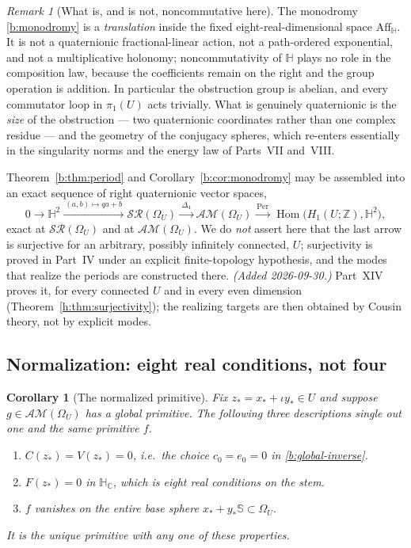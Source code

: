 \documentclass[11pt,a4paper]{article}
\numberwithin{equation}{section}
\newtheorem{corollary}[theorem]{Corollary}
\theoremstyle{definition}
\theoremstyle{remark}
\newtheorem{remark}[theorem]{Remark}
\theoremstyle{plain}
\newcommand{\HH}{\mathbb H}
\newcommand{\HC}{\mathbb H_{\mathbb C}}
\newcommand{\ZZ}{\mathbb Z}
\newcommand{\SSS}{\mathbb S}
\newcommand{\lap}{\Delta_4}
\newcommand{\SR}{\mathcal{SR}}
\newcommand{\AM}{\mathcal{AM}}
\newcommand{\Om}{\Omega}
\newcommand{\Aff}{\mathrm{Aff}_{\HH}}
\newcommand{\Per}{\mathrm{Per}}
\newcommand{\pot}{C}          %
\newcommand{\potV}{V}         %
\begin{document}
\begin{remark}[What is, and is not, noncommutative here]
\label{b:rem:abelian}
The monodromy \eqref{b:monodromy} is a \emph{translation} inside the fixed
eight-real-dimensional space $\Aff$.  It is not a quaternionic
fractional-linear action, not a path-ordered exponential, and not a
multiplicative holonomy; noncommutativity of $\HH$ plays no role in the
composition law, because the coefficients remain on the right and the group
operation is addition.  In particular the obstruction group is abelian, and
every commutator loop in $\pi_1(U)$ acts trivially.  What is genuinely
quaternionic is the \emph{size} of the obstruction --- two quaternionic
coordinates rather than one complex residue --- and the geometry of the
conjugacy spheres, which re-enters essentially in the singularity norms and
the energy law of Parts~VII and~VIII.
\end{remark}

Theorem~\ref{b:thm:period} and Corollary~\ref{b:cor:monodromy} may be
assembled into an exact sequence of right quaternionic vector spaces,
\begin{equation}
 0\longrightarrow\HH^2\xrightarrow{\ (a,b)\mapsto qa+b\ }
 \SR(\Om_U)\xrightarrow{\ \lap\ }\AM(\Om_U)
 \xrightarrow{\ \Per\ }\operatorname{Hom}\bigl(H_1(U;\ZZ),\HH^2\bigr),
 \label{b:exact-general}
\end{equation}
exact at $\SR(\Om_U)$ and at $\AM(\Om_U)$.  We do \emph{not} assert here that
the last arrow is surjective for an arbitrary, possibly infinitely connected,
$U$; surjectivity is proved in Part~IV under an explicit finite-topology
hypothesis, and the modes that realize the periods are constructed there.
\emph{(Added 2026-09-30.)} Part~XIV proves it, for every connected $U$ and in
every even dimension (Theorem~\ref{h:thm:surjectivity}); the realizing
targets are then obtained by Cousin theory, not by explicit modes.

\subsection{Normalization: eight real conditions, not four}
\label{b:sub:normalization}

\begin{corollary}[The normalized primitive]
\label{b:cor:normalization}
Fix $z_*=x_*+\iota y_*\in U$ and suppose $g\in\AM(\Om_U)$ has a global
primitive.  The following three descriptions single out one and the same
primitive $f$.
\begin{enumerate}[label=\textup{(\alph*)}]
\item $\pot(z_*)=\potV(z_*)=0$, i.e.\ the choice $c_0=e_0=0$ in
\eqref{b:global-inverse}.
\item $F(z_*)=0$ in $\HC$, which is eight real conditions on the stem.
\item $f$ vanishes on the entire base sphere $x_*+y_*\SSS\subset\Om_U$.
\end{enumerate}
It is the unique primitive with any one of these properties.
\end{corollary}
\end{document}
